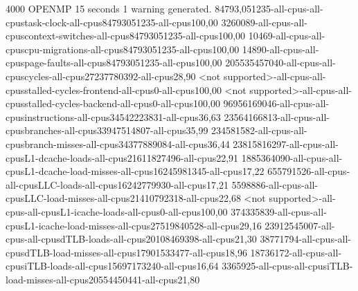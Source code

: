 
4000
OPENMP
15 seconds
1 warning generated.
84793,051235-all-cpus-all-cpustask-clock-all-cpus84793051235-all-cpus100,00
3260089-all-cpus-all-cpuscontext-switches-all-cpus84793051235-all-cpus100,00
10469-all-cpus-all-cpuscpu-migrations-all-cpus84793051235-all-cpus100,00
14890-all-cpus-all-cpuspage-faults-all-cpus84793051235-all-cpus100,00
205535457040-all-cpus-all-cpuscycles-all-cpus27237780392-all-cpus28,90
<not supported>-all-cpus-all-cpusstalled-cycles-frontend-all-cpus0-all-cpus100,00
<not supported>-all-cpus-all-cpusstalled-cycles-backend-all-cpus0-all-cpus100,00
96956169046-all-cpus-all-cpusinstructions-all-cpus34542223831-all-cpus36,63
23564166813-all-cpus-all-cpusbranches-all-cpus33947514807-all-cpus35,99
234581582-all-cpus-all-cpusbranch-misses-all-cpus34377889084-all-cpus36,44
23815816297-all-cpus-all-cpusL1-dcache-loads-all-cpus21611827496-all-cpus22,91
1885364090-all-cpus-all-cpusL1-dcache-load-misses-all-cpus16245981345-all-cpus17,22
655791526-all-cpus-all-cpusLLC-loads-all-cpus16242779930-all-cpus17,21
5598886-all-cpus-all-cpusLLC-load-misses-all-cpus21410792318-all-cpus22,68
<not supported>-all-cpus-all-cpusL1-icache-loads-all-cpus0-all-cpus100,00
374335839-all-cpus-all-cpusL1-icache-load-misses-all-cpus27519840528-all-cpus29,16
23912545007-all-cpus-all-cpusdTLB-loads-all-cpus20108469398-all-cpus21,30
38771794-all-cpus-all-cpusdTLB-load-misses-all-cpus17901533477-all-cpus18,96
18736172-all-cpus-all-cpusiTLB-loads-all-cpus15697173240-all-cpus16,64
3365925-all-cpus-all-cpusiTLB-load-misses-all-cpus20554450441-all-cpus21,80
